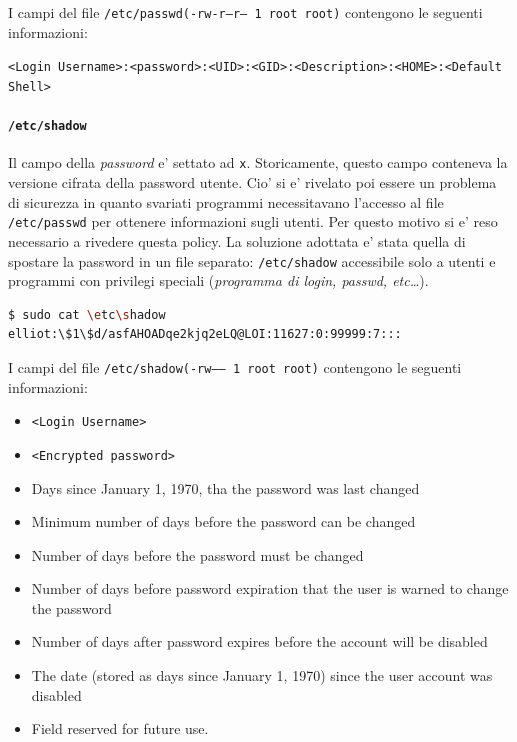 I campi del file \texttt{/etc/passwd}\texttt{(-rw-r--r-- 1 root root)} contengono le seguenti informazioni:
\begin{center}
	\texttt{<Login Username>:<password>:<UID>:<GID>:<Description>:<HOME>:<Default Shell>}
\end{center}

\paragraph{\texttt{/etc/shadow}}
Il campo della \emph{password} e' settato ad \texttt{x}. Storicamente, questo campo conteneva la versione cifrata della password utente. Cio' si e' rivelato poi essere un problema di sicurezza in quanto svariati programmi necessitavano l'accesso al file \texttt{/etc/passwd} per ottenere informazioni sugli utenti. Per questo motivo si e' reso necessario a rivedere questa policy. La soluzione adottata e' stata quella di spostare la password in un file separato: \texttt{/etc/shadow} accessibile solo a utenti e programmi con privilegi speciali (\emph{programma di login, passwd, etc\dots}).

\begin{lstlisting}[language=bash,basicstyle=\ttfamily,frame=single,caption={Struttura di un file /etc/shadow},captionpos=b]
$ sudo cat \etc\shadow
elliot:\$1\$d/asfAHOADqe2kjq2eLQ@LOI:11627:0:99999:7:::
\end{lstlisting}

I campi del file \texttt{/etc/shadow}\texttt{(-rw------ 1 root root)} contengono le seguenti informazioni:
\begin{itemize}
	\item \texttt{<Login Username>}
	\item \texttt{<Encrypted password>}
	\item Days since January 1, 1970, tha the password was last changed
	\item Minimum number of days before the password can be changed
	\item Number of days before the password must be changed
	\item Number of days before password expiration that the user is warned to change the password
	\item Number of days after password expires before the account will be disabled
	\item The date (stored as days since January 1, 1970) since the user account was disabled
	\item Field reserved for future use.
\end{itemize}

